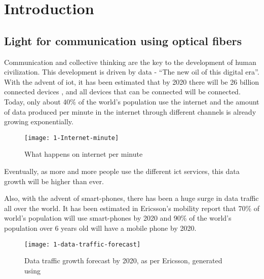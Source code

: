 \documentclass[../report.tex]{subfiles}
\begin{document}
	
	
\chapter{Introduction} 
	\section{Light for communication using optical fibers}
Communication and collective thinking are the key to the development of human civilization. This development is driven by data - “The new oil of this digital era”. With the advent of \gls{iot}, it has been estimated that by 2020 there will be 26 billion connected devices \cite{gartner_iot}, and all devices that can be connected will be connected. Today, only about 40\% \cite{internet_users} of the world’s population use the internet and the amount of data produced per minute in the internet through different channels is already growing exponentially. 

\begin{figure}[h]
	\centering
	\texttt{[image: 1-Internet-minute]}
	\caption{What happens on internet per minute \cite{internet_minute}}
	\label{fig:1_internet_minute}
\end{figure}
\noindent Eventually, as more and more people use the different \gls{ict} services, this data growth will be higher than ever. \par

Also, with the advent of smart-phones, there has been a huge surge in data traffic all over the world. It has been estimated in Ericsson's mobility report \cite{ericsson_mobility_report} that 70\% of world's population will use smart-phones by 2020 and 90\% of the world's population over 6 years old will have a mobile phone by 2020. 
\begin{figure}[!tbp]
	\centering
	\texttt{[image: 1-data-traffic-forecast]}
	\caption{Data traffic growth forecast by 2020, as per Ericsson, generated using \cite{ericsson_traffic_exploration} \cite{internet_minute}}
	\label{fig:1_data_traffic_forecast}
\end{figure}
\end{document}
